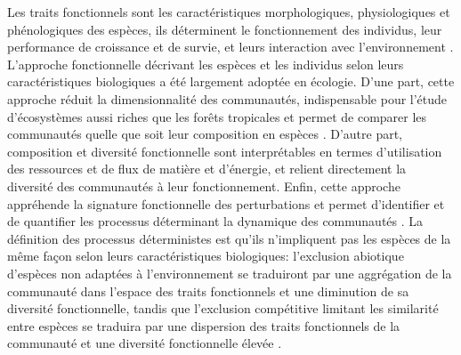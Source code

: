\documentclass[
  11pt,
  french,
  A4paper,
  extrafontsizes,onecolumn,openright
  ]{memoir}
\begin{document}
Les traits fonctionnels sont les caractéristiques morphologiques,
physiologiques et phénologiques des espèces, ils déterminent le
fonctionnement des individus, leur performance de croissance et de
survie, et leurs interaction avec l'environnement
\autocite{Violle2007b}. L'approche fonctionnelle décrivant les espèces
et les individus selon leurs caractéristiques biologiques a été
largement adoptée en écologie. D'une part, cette approche réduit la
dimensionnalité des communautés, indispensable pour l'étude
d'écosystèmes aussi riches que les forêts tropicales et permet de
comparer les communautés quelle que soit leur composition en espèces
\autocites{Begon2006}{Scheiter2013}{Mouillot2013a}{Sakschewski2016}.
D'autre part, composition et diversité fonctionnelle sont interprétables
en termes d'utilisation des ressources et de flux de matière et
d'énergie, et relient directement la diversité des communautés à leur
fonctionnement. Enfin, cette approche appréhende la signature
fonctionnelle des perturbations et permet d'identifier et de quantifier
les processus déterminant la dynamique des communautés
\autocite{Funk2017}. La définition des processus déterministes est
qu'ils n'impliquent pas les espèces de la même façon selon leurs
caractéristiques biologiques: l'exclusion abiotique d'espèces non
adaptées à l'environnement se traduiront par une aggrégation de la
communauté dans l'espace des traits fonctionnels et une diminution de sa
diversité fonctionnelle, tandis que l'exclusion compétitive limitant les
similarité entre espèces se traduira par une dispersion des traits
fonctionnels de la communauté et une diversité fonctionnelle élevée
\autocites{McGill2006}{Kunstler2012}.
\end{document}
